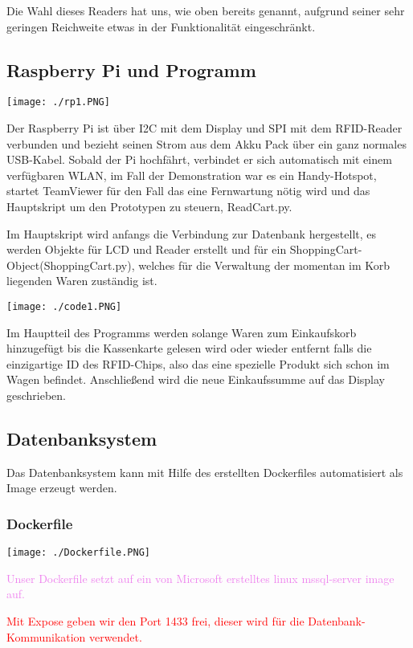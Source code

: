 \documentclass{sigchi}
\begin{document}
Die Wahl dieses Readers hat uns, wie oben bereits genannt, aufgrund seiner sehr geringen Reichweite etwas in der Funktionalität eingeschränkt.


\subsection{Raspberry Pi und Programm}

\texttt{[image: ./rp1.PNG]}

Der Raspberry Pi ist über I2C mit dem Display und SPI mit dem RFID-Reader verbunden und bezieht seinen Strom aus dem Akku Pack über ein ganz normales USB-Kabel. Sobald der Pi hochfährt, verbindet er sich automatisch mit einem verfügbaren WLAN, im Fall der Demonstration war es ein Handy-Hotspot, startet TeamViewer für den Fall das eine Fernwartung nötig wird und das Hauptskript um den Prototypen zu steuern, ReadCart.py.

Im Hauptskript wird anfangs die Verbindung zur Datenbank hergestellt, es werden Objekte für LCD und Reader erstellt und für ein ShoppingCart-Object(ShoppingCart.py), welches für die Verwaltung der momentan im Korb liegenden Waren zuständig ist.

\texttt{[image: ./code1.PNG]}

Im Hauptteil des Programms werden solange Waren zum Einkaufskorb hinzugefügt bis die Kassenkarte gelesen wird oder wieder entfernt falls die einzigartige ID des RFID-Chips, also das eine spezielle Produkt sich schon im Wagen befindet. Anschließend wird die neue Einkaufssumme auf das Display geschrieben.


\subsection{Datenbanksystem}
Das Datenbanksystem kann mit Hilfe des erstellten Dockerfiles automatisiert als Image erzeugt werden.

\subsubsection{Dockerfile}
\texttt{[image: ./Dockerfile.PNG]}

\textcolor{violet}{Unser Dockerfile setzt auf ein von Microsoft erstelltes linux mssql-server image auf.}

\textcolor{red}{Mit Expose geben wir den Port 1433 frei, dieser wird für die Datenbank-Kommunikation verwendet.}
\end{document}

